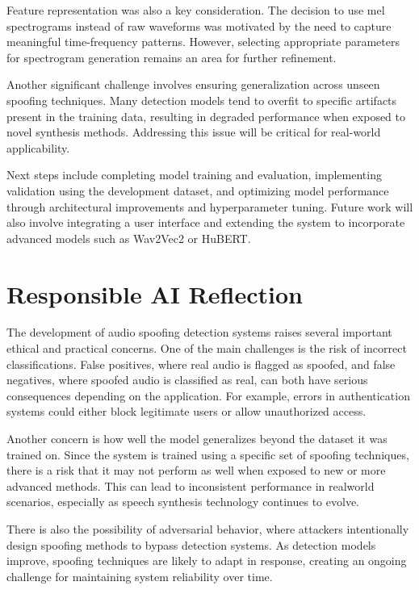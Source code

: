 \documentclass[conference]{IEEEtran}
\begin{document}
Feature representation was also a key consideration. The decision
to use mel spectrograms instead of raw waveforms was
motivated by the need to capture meaningful time-frequency
patterns. However, selecting appropriate parameters for spectrogram
generation remains an area for further refinement.

Another significant challenge involves ensuring generalization
across unseen spoofing techniques. Many detection
models tend to overfit to specific artifacts present in the
training data, resulting in degraded performance when exposed
to novel synthesis methods. Addressing this issue will be
critical for real-world applicability.

Next steps include completing model training and evaluation,
implementing validation using the development dataset,
and optimizing model performance through architectural improvements
and hyperparameter tuning. Future work will also
involve integrating a user interface and extending the system to
incorporate advanced models such as Wav2Vec2 or HuBERT.

\section{Responsible AI Reflection}

The development of audio spoofing detection systems raises
several important ethical and practical concerns. One of the
main challenges is the risk of incorrect classifications. False
positives, where real audio is flagged as spoofed, and false
negatives, where spoofed audio is classified as real, can both
have serious consequences depending on the application. For
example, errors in authentication systems could either block
legitimate users or allow unauthorized access.

Another concern is how well the model generalizes beyond
the dataset it was trained on. Since the system is trained using
a specific set of spoofing techniques, there is a risk that it may
not perform as well when exposed to new or more advanced
methods. This can lead to inconsistent performance in realworld
scenarios, especially as speech synthesis technology
continues to evolve.

There is also the possibility of adversarial behavior, where
attackers intentionally design spoofing methods to bypass
detection systems. As detection models improve, spoofing
techniques are likely to adapt in response, creating an ongoing
challenge for maintaining system reliability over time.
\end{document}
